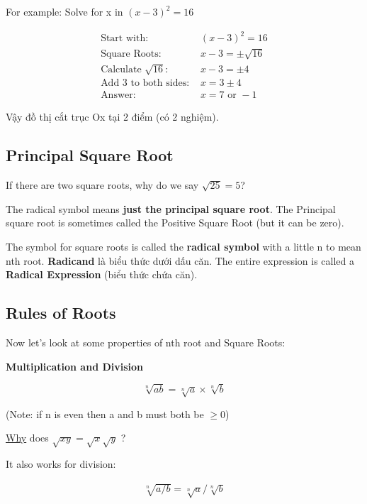 For example: Solve for x in $(x-3)^{2}=16$

\[
  \begin{aligned}
    \text{Start with: } &(x-3)^{2}=16\\
    \text{Square Roots: } &x-3= \pm \sqrt{16}\\
    \text{Calculate } \sqrt{16} \text{: } &x-3= \pm4\\
    \text{Add 3 to both sides: } &x=3 \pm 4\\
    \text{Answer: } &x=7 \text{ or } -1
  \end{aligned}
\]

Vậy đồ thị cắt trục Ox tại 2 điểm (có 2 nghiệm).

\subsection{Principal Square Root}

If there are two square roots, why do we say $\sqrt{25}=5$?

The radical symbol means \textbf{just the principal square root}. The Principal square root is sometimes called the Positive Square Root (but it can be zero).

The symbol for square roots \q{\(\sqrt{}\)} is called the \textbf{radical symbol} with a little n to mean nth root. \textbf{Radicand} là biểu thức dưới dấu căn. The entire expression is called a \textbf{Radical Expression} (biểu thức chứa căn).

\subsection{Rules of Roots}

Now let's look at some properties of nth root and Square Roots:

\textbf{Multiplication and Division}

\begin{equation}
  \sqrt[n]{ab}=\sqrt[n]{a} \times \sqrt[n]{b}
\end{equation}

(Note: if n is even then a and b must both be \(\geq 0\))

\href{https://www.mathsisfun.com/algebra/square-root.html}{Why} does $\sqrt{xy}=\sqrt{x}\sqrt{y}$ ?

It also works for division:

\begin{equation}
  \begin{aligned}
    \sqrt[n]{a/b}=\sqrt[n]{a}/\sqrt[n]{b}
  \end{aligned}
\end{equation}

